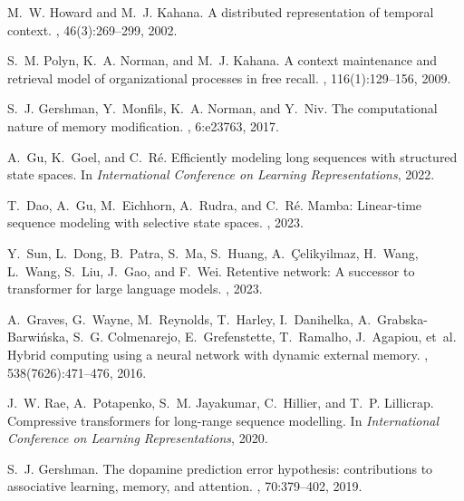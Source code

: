
\begin{thebibliography}{20}

M.~W. Howard and M.~J. Kahana.
\newblock A distributed representation of temporal context.
, 46(3):269--299, 2002.

S.~M. Polyn, K.~A. Norman, and M.~J. Kahana.
\newblock A context maintenance and retrieval model of organizational processes in free recall.
, 116(1):129--156, 2009.

S.~J. Gershman, Y.~Monfils, K.~A. Norman, and Y.~Niv.
\newblock The computational nature of memory modification.
, 6:e23763, 2017.

A.~Gu, K.~Goel, and C.~R{\'e}.
\newblock Efficiently modeling long sequences with structured state spaces.
\newblock In {\em International Conference on Learning Representations}, 2022.

T.~Dao, A.~Gu, M.~Eichhorn, A.~Rudra, and C.~R{\'e}.
\newblock Mamba: Linear-time sequence modeling with selective state spaces.
, 2023.

Y.~Sun, L.~Dong, B.~Patra, S.~Ma, S.~Huang, A.~Çelikyilmaz, H.~Wang, L.~Wang, S.~Liu, J.~Gao, and F.~Wei.
\newblock Retentive network: A successor to transformer for large language models.
, 2023.

A.~Graves, G.~Wayne, M.~Reynolds, T.~Harley, I.~Danihelka, A.~Grabska-Barwińska, S.~G. Colmenarejo, E.~Grefenstette, T.~Ramalho, J.~Agapiou, et~al.
\newblock Hybrid computing using a neural network with dynamic external memory.
, 538(7626):471--476, 2016.

J.~W. Rae, A.~Potapenko, S.~M. Jayakumar, C.~Hillier, and T.~P. Lillicrap.
\newblock Compressive transformers for long-range sequence modelling.
\newblock In {\em International Conference on Learning Representations}, 2020.

S.~J. Gershman.
\newblock The dopamine prediction error hypothesis: contributions to associative learning, memory, and attention.
, 70:379--402, 2019.


\end{thebibliography}
